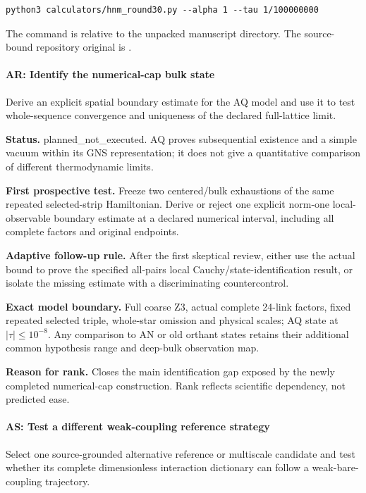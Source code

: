 \begin{verbatim}
python3 calculators/hnm_round30.py --alpha 1 --tau 1/100000000
\end{verbatim}

The command is relative to the unpacked manuscript directory. The source-bound repository original is .

\paragraph{AR: Identify the numerical-cap bulk state} Derive an explicit spatial boundary estimate for the AQ model and use it to test whole-sequence convergence and uniqueness of the declared full-lattice limit.

\textbf{Status.} planned\_not\_executed. AQ proves subsequential existence and a simple vacuum within its GNS representation; it does not give a quantitative comparison of different thermodynamic limits.

\textbf{First prospective test.} Freeze two centered/bulk exhaustions of the same repeated selected-strip Hamiltonian. Derive or reject one explicit norm-one local-observable boundary estimate at a declared numerical interval, including all complete factors and original endpoints.

\textbf{Adaptive follow-up rule.} After the first skeptical review, either use the actual bound to prove the specified all-pairs local Cauchy/state-identification result, or isolate the missing estimate with a discriminating countercontrol.

\textbf{Exact model boundary.} Full coarse Z3, actual complete 24-link factors, fixed repeated selected triple, whole-star omission and physical scales; AQ state at \(|\tau|\le 10^{-8}\). Any comparison to AN or old orthant states retains their additional common hypothesis range and deep-bulk observation map.

\textbf{Reason for rank.} Closes the main identification gap exposed by the newly completed numerical-cap construction. Rank reflects scientific dependency, not predicted ease.

\paragraph{AS: Test a different weak-coupling reference strategy} Select one source-grounded alternative reference or multiscale candidate and test whether its complete dimensionless interaction dictionary can follow a weak-bare-coupling trajectory.


